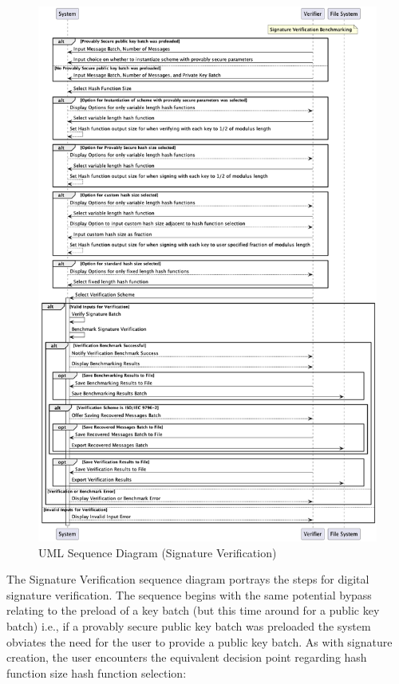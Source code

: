 \documentclass[]{final_report}
\theoremstyle{definition}
\begin{document}
\begin{figure}[H]
    \centering
    \includegraphics[scale=0.4]{main_pictures/sequenceVerify.png}
    \caption{UML Sequence Diagram (Signature Verification)}
    \label{fig:uc}
\end{figure}

The Signature Verification sequence diagram portrays the steps for digital signature verification. The sequence begins with the same potential bypass relating to the preload of a key batch (but this time around for a public key batch) i.e.,  if a provably secure public key batch was preloaded the system obviates the need for the user to provide a public key batch.
As with signature creation, the user encounters the equivalent decision point regarding hash function size hash function selection:
\end{document}
